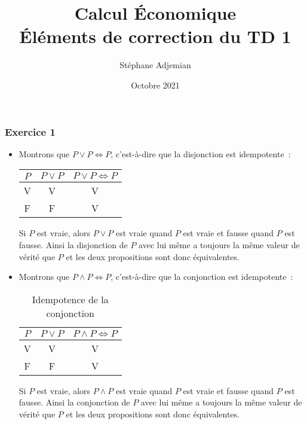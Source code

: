 \documentclass[10pt,notheorems]{beamer}
\theoremstyle{plain}
\theoremstyle{definition} %
\begin{document}
\title{Calcul Économique\\\small{Éléments de correction du TD 1}}
\author[S. Adjemian]{Stéphane Adjemian}
 \date{Octobre 2021}

\begin{frame}
  \titlepage{}
\end{frame}


\begin{frame}
  \frametitle{Exercice 1}
  \fontsize{8}{10}\selectfont

  \begin{itemize}
    
  \item Montrons que $P\lor P \Leftrightarrow P$, c'est-à-dire que la disjonction est idempotente~:\newline
    \begin{table}[H]
      \centering
      \begin{tabular}[H]{|cc|c|}
        \hline
        $P$ & $P\lor P$ & $P\lor P \Leftrightarrow P$\\ \hline
        V & V & V \\
        F & F & V \\
        \hline\hline
      \end{tabular}
      \label{tab:or:idempotence}
    \end{table}

    \bigskip
    
  Si $P$ est vraie, alors $P\lor P$ est vraie quand $P$ est vraie et fausse
  quand $P$ est fausse. Ainsi la disjonction de $P$ avec lui même a toujours la
  même valeur de vérité que $P$ et les deux propositions sont donc équivalentes.\newline

  \item Montrons que $P\land P \Leftrightarrow P$, c'est-à-dire que la conjonction est idempotente~:\newline
    \begin{table}[H]
      \centering
      \begin{tabular}[H]{|cc|c|}
        \hline
        $P$ & $P\lor P$ & $P\land P \Leftrightarrow P$\\ \hline
        V & V & V \\
        F & F & V \\
        \hline\hline
      \end{tabular}
      \caption{Idempotence de la conjonction}
      \label{tab:and:idempotence}
    \end{table}

    \bigskip
    
  Si $P$ est vraie, alors $P\land P$ est vraie quand $P$ est vraie et fausse
  quand $P$ est fausse. Ainsi la conjonction de $P$ avec lui même a toujours la
  même valeur de vérité que $P$ et les deux propositions sont donc équivalentes.
    
  \end{itemize}
  
\end{frame}
\end{document}
